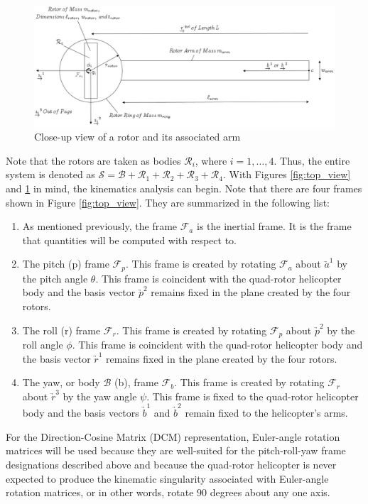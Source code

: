 \documentclass[journal]{IEEEtran}
\begin{document}
\begin{figure}[ht]
    \centering
        \includegraphics[width=.50\textwidth]{rotor_arm}
    \caption{Close-up view of a rotor and its associated arm}
    \label{fig:rotor_arm}
\end{figure}

Note that the rotors are taken as bodies $\mathcal{R}_i$, where $i=1,\dots,4$. Thus, the entire system is denoted as $\mathcal{S}=\mathcal{B}+\mathcal{R}_1+\mathcal{R}_2+\mathcal{R}_3+\mathcal{R}_4$. With Figures \ref{fig:top_view} and \ref{fig:rotor_arm} in mind, the kinematics analysis can begin. Note that there are four frames shown in Figure \ref{fig:top_view}. They are summarized in the following list:

\begin{enumerate}
\item As mentioned previously, the frame $\mathcal{F}_a$ is the inertial frame. It is the frame that quantities will be computed with respect to. 
\item The pitch (p) frame $\mathcal{F}_p$. This frame is created by rotating $\mathcal{F}_a$ about $\underrightarrow{a}^1$ by the pitch angle $\theta$. This frame is coincident with the quad-rotor helicopter body and the basis vector $\underrightarrow{p}^2$ remains fixed in the plane created by the four rotors.
\item The roll (r) frame $\mathcal{F}_r$. This frame is created by rotating $\mathcal{F}_p$ about $\underrightarrow{p}^2$ by the roll angle $\phi$. This frame is coincident with the quad-rotor helicopter body and the basis vector $\underrightarrow{r}^1$ remains fixed in the plane created by the four rotors.
\item The yaw, or body $\mathcal{B}$ (b), frame $\mathcal{F}_b$. This frame is created by rotating $\mathcal{F}_r$ about $\underrightarrow{r}^3$ by the yaw angle $\psi$. This frame is fixed to the quad-rotor helicopter body and the basis vectors $\underrightarrow{b}^1$ and $\underrightarrow{b}^2$ remain fixed to the helicopter's arms. 
\end{enumerate}

For the Direction-Cosine Matrix (DCM) representation, Euler-angle rotation matrices will be used because they are well-suited for the pitch-roll-yaw frame designations described above and because the quad-rotor helicopter is never expected to produce the kinematic singularity associated with Euler-angle rotation matrices, or in other words, rotate $90$ degrees about any one axis. 
\end{document}
